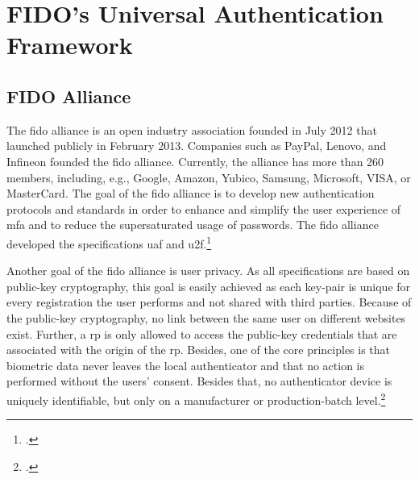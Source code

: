 \section{FIDO's Universal Authentication Framework}
\subsection{FIDO Alliance}
\label{subsec:fido_alliance}

The \gls{fido} alliance is an open industry association founded in July 2012 that launched publicly in February 2013. Companies such as PayPal, Lenovo, and Infineon founded the \gls{fido} alliance. Currently, the alliance has more than 260 members, including, e.g., Google, Amazon, Yubico, Samsung, Microsoft, VISA, or MasterCard. The goal of the \gls{fido} alliance is to develop new authentication protocols and standards in order to enhance and simplify the user experience of \gls{mfa} and to reduce the supersaturated usage of passwords. The \gls{fido} alliance developed the specifications \gls{uaf} and \gls{u2f}.\footcites[See][]{fido-history}[See][583]{eckert-it-sec-9}[See][17]{fido-ct-2}

Another goal of the \gls{fido} alliance is user privacy. As all specifications are based on public-key cryptography, this goal is easily achieved as each key-pair is unique for every registration the user performs and not shared with third parties. Because of the public-key cryptography, no link between the same user on different websites exist. Further, a \gls{rp} is only allowed to access the public-key credentials that are associated with the origin of the \gls{rp}. Besides, one of the core principles is that biometric data never leaves the local authenticator and that no action is performed without the users' consent. Besides that, no authenticator device is uniquely identifiable, but only on a manufacturer or production-batch level.\footcite[See][6--7]{fido-privacy}


